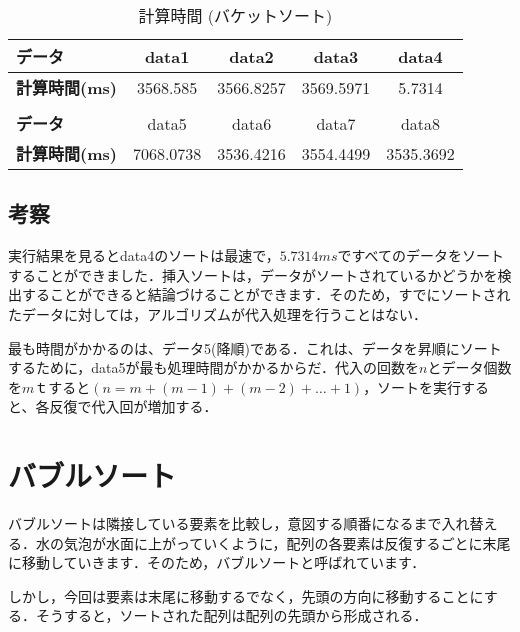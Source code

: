 \documentclass[a4j, titlepage]{jarticle}
\begin{document}
            \begin{table}[tbh]
                \caption{計算時間 (バケットソート)}
                \label{tab:insertion}
                \begin{center}
                    \begin{tabular}{lcccc}
                        \hline
                        \textbf{データ} & data1 & data2 &data3 &data4 \\ \hline
                        \textbf{計算時間(ms)} & 3568.585 & 3566.8257 & 3569.5971 & 5.7314\\ \hline
                        \\ \hline
                        \textbf{データ} & data5 &data6 &data7 &data8\\ \hline
                        \textbf{計算時間(ms)} &7068.0738 & 3536.4216 & 3554.4499 & 3535.3692\\ \hline
                    \end{tabular}
                \end{center}
            \end{table}
        
        \subsection{考察}
            実行結果を見るとdata4のソートは最速で，$5.7314ms$ですべてのデータをソートすることができました．挿入ソートは，データがソートされているかどうかを検出することができると結論づけることができます．そのため，すでにソートされたデータに対しては，アルゴリズムが代入処理を行うことはない．
            
            最も時間がかかるのは、データ5(降順)である．これは、データを昇順にソートするために，data5が最も処理時間がかかるからだ．代入の回数を$n$とデータ個数を$m$ｔすると$( n = m + (m-1) + (m-2) + \dots + 1)$，ソートを実行すると、各反復で代入回が増加する．


    \section{バブルソート}
        バブルソートは隣接している要素を比較し，意図する順番になるまで入れ替える．水の気泡が水面に上がっていくように，配列の各要素は反復するごとに末尾に移動していきます．そのため，バブルソートと呼ばれています．

        しかし，今回は要素は末尾に移動するでなく，先頭の方向に移動することにする．そうすると，ソートされた配列は配列の先頭から形成される．
\end{document}
